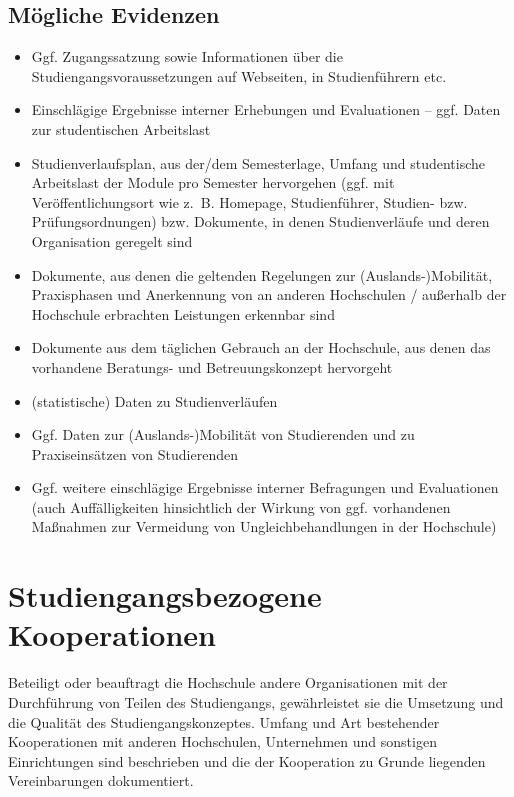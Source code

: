 \section{Mögliche Evidenzen}\label{muxf6gliche-evidenzen}

\begin{itemize}
\item
  Ggf. Zugangssatzung sowie Informationen über die
  Studiengangsvoraussetzungen auf Webseiten, in Studienführern etc.
\item
  Einschlägige Ergebnisse interner Erhebungen und Evaluationen -- ggf.
  Daten zur studentischen Arbeitslast
\item
  Studienverlaufsplan, aus der/dem Semesterlage, Umfang und studentische
  Arbeitslast der Module pro Semester hervorgehen (ggf. mit
  Veröffentlichungsort wie z.~B. Homepage, Studienführer, Studien- bzw.
  Prüfungsordnungen) bzw. Dokumente, in denen Studienverläufe und deren
  Organisation geregelt sind
\item
  Dokumente, aus denen die geltenden Regelungen zur
  (Auslands-)Mobilität, Praxisphasen und Anerkennung von an anderen
  Hochschulen / außerhalb der Hochschule erbrachten Leistungen erkennbar
  sind
\item
  Dokumente aus dem täglichen Gebrauch an der Hochschule, aus denen das
  vorhandene Beratungs- und Betreuungskonzept hervorgeht
\item
  (statistische) Daten zu Studienverläufen
\item
  Ggf. Daten zur (Auslands-)Mobilität von Studierenden und zu
  Praxiseinsätzen von Studierenden
\item
  Ggf. weitere einschlägige Ergebnisse interner Befragungen und
  Evaluationen (auch Auffälligkeiten hinsichtlich der Wirkung von ggf.
  vorhandenen Maßnahmen zur Vermeidung von Ungleichbehandlungen in der
  Hochschule)
\end{itemize}

%

\chapter{Studiengangsbezogene Kooperationen}\label{Studiengangsbezogene Kooperationen}


Beteiligt oder beauftragt die Hochschule andere Organisationen mit der
Durchführung von Teilen des Studiengangs, gewährleistet sie die
Umsetzung und die Qualität des Studiengangskonzeptes. Umfang und Art
bestehender Kooperationen mit anderen Hochschulen, Unternehmen und
sonstigen Einrichtungen sind beschrieben und die der Kooperation zu
Grunde liegenden Vereinbarungen dokumentiert.

